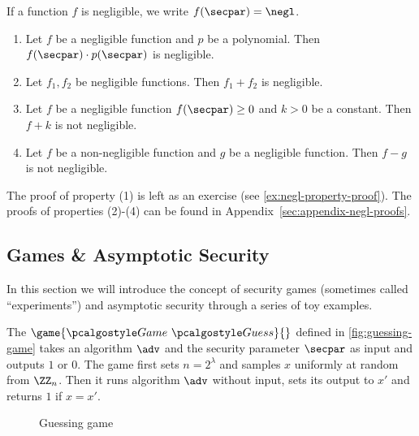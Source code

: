 If a function $f$ is negligible, we write $f(\secpar) = \negl$.


\begin{lemma}
  \label{lem:negl}
  \hfill
  \begin{enumerate}
  \item Let $f$ be a negligible function and $p$ be a polynomial. Then $f(\secpar) \cdot p(\secpar)$ is negligible.
  \item Let $f_1, f_2$ be negligible functions. Then $f_1 + f_2$ is negligible.
  \item Let $f$ be a negligible function $f(\secpar) \ge 0$ and $k > 0$ be a constant. Then $f + k$ is not negligible.
  \item Let $f$ be a non-negligible function and $g$ be a negligible function. Then $f - g$ is not negligible.
  \end{enumerate}
\end{lemma}

The proof of property (1) is left as an exercise (see \autoref{ex:negl-property-proof}).
The proofs of properties (2)-(4) can be found in Appendix~\ref{sec:appendix-negl-proofs}.

\subsection{Games \& Asymptotic Security}

In this section we will introduce the concept of security games (sometimes called ``experiments'') and asymptotic security through a series of toy examples.

The $\game{\Game~\algo{Guess}}{}$ defined in \autoref{fig:guessing-game} takes an algorithm $\adv$ and the security parameter $\secpar$ as input and outputs $1$ or $0$.
The game first sets $n = 2^\lambda$ and samples $x$ uniformly at random from $\ZZ_n$.
Then it runs algorithm $\adv$ without input, sets its output to $x'$ and returns $1$ if $x = x'$.

\begin{figure}[tbhp]
  \begin{center}
    \begin{tcolorbox}[width=3cm]
      \begin{pchstack}[center]
      \end{pchstack}
    \end{tcolorbox}
  \end{center}
  \caption{Guessing game\label{fig:guessing-game}}
\end{figure}

